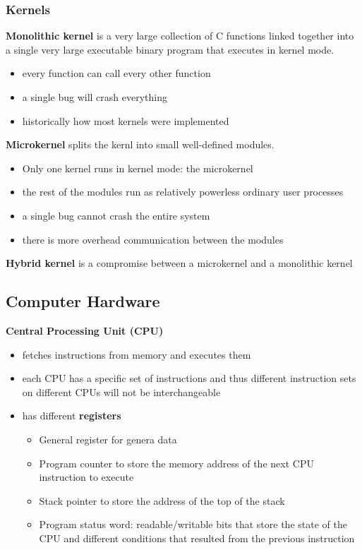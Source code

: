 \documentclass{article}
\begin{document}
    \subsubsection{Kernels}

    \textbf{Monolithic kernel} is a very large collection of C functions linked together into a single very large executable binary program that executes in kernel mode.

    \begin{itemize}
    \item every function can call every other function
    \item a single bug will crash everything
    \item historically how most kernels were implemented
    \end{itemize}

    \noindent \textbf{Microkernel} splits the kernl into small well-defined modules. 


    \begin{itemize}
    \item Only one kernel runs in kernel mode: the microkernel
    \item the rest of the modules run as relatively powerless ordinary user processes
    \item a single bug cannot crash the entire system
    \item there is more overhead communication between the modules
    \end{itemize}

    \noindent \textbf{Hybrid kernel} is a compromise between a microkernel and a monolithic kernel

\subsection{Computer Hardware}

    \textbf{Central Processing Unit (CPU)}

    \begin{itemize}
    \item fetches instructions from memory and executes them
    \item each CPU has a specific set of instructions and thus different instruction sets on different CPUs will not be interchangeable
    \item has different \textbf{registers}
    \begin{itemize}
    \item General register for genera data
    \item Program counter to store the memory address of the next CPU instruction to execute
    \item Stack pointer to store the address of the top of the stack
    \item Program status word: readable/writable bits that store the state of the CPU and different conditions that resulted from the previous instruction
    \end{itemize}
    \end{itemize}
\end{document}
